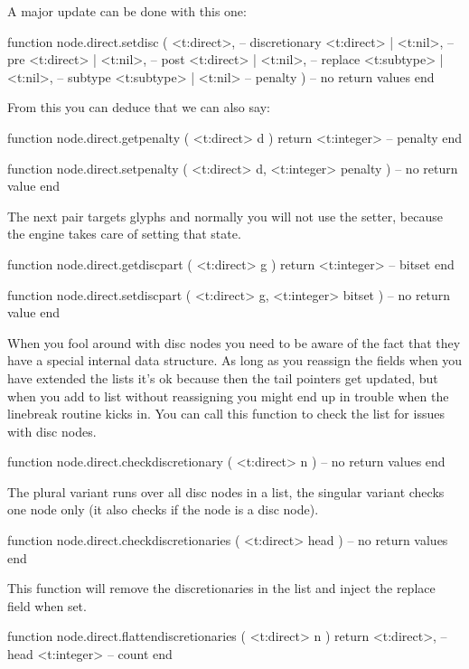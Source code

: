 A major update can be done with this one:

\starttyping[option=LUA]
function node.direct.setdisc (
    <t:direct>,            -- discretionary
    <t:direct>  | <t:nil>, -- pre
    <t:direct>  | <t:nil>, -- post
    <t:direct>  | <t:nil>, -- replace
    <t:subtype> | <t:nil>, -- subtype
    <t:subtype> | <t:nil>  -- penalty
)
    -- no return values
end
\stoptyping

From this you can deduce that we can also say:

\starttyping[option=LUA]
function node.direct.getpenalty ( <t:direct> d )
    return <t:integer> -- penalty
end

function node.direct.setpenalty ( <t:direct> d, <t:integer> penalty )
    -- no return value
end
\stoptyping

The next pair targets glyphs and normally you will not use the setter, because
the engine takes care of setting that state.

\starttyping[option=LUA]
function node.direct.getdiscpart ( <t:direct> g )
    return <t:integer> -- bitset
end

function node.direct.setdiscpart ( <t:direct> g, <t:integer> bitset )
    -- no return value
end
\stoptyping

When you fool around with disc nodes you need to be aware of the fact that they
have a special internal data structure. As long as you reassign the fields when
you have extended the lists it's ok because then the tail pointers get updated,
but when you add to list without reassigning you might end up in trouble when
the linebreak routine kicks in. You can call this function to check the list for
issues with disc nodes.

\starttyping[option=LUA]
function node.direct.checkdiscretionary ( <t:direct> n )
    -- no return values
end
\stoptyping

The plural variant runs over all disc nodes in a list, the singular variant
checks one node only (it also checks if the node is a disc node).

\starttyping[option=LUA]
function node.direct.checkdiscretionaries ( <t:direct> head )
    -- no return values
end
\stoptyping

This function will remove the discretionaries in the list and inject the replace
field when set.

\starttyping[option=LUA]
function node.direct.flattendiscretionaries ( <t:direct> n )
    return
        <t:direct>, -- head
        <t:integer> -- count
end
\stoptyping

